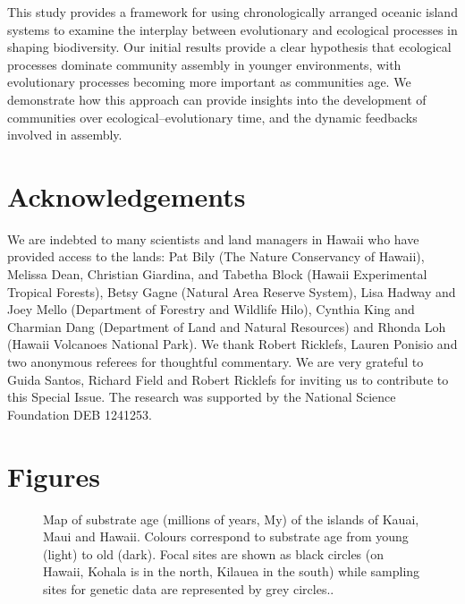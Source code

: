 This study provides a framework for using chronologically arranged
oceanic island systems to examine the interplay between evolutionary
and ecological processes in shaping biodiversity. Our initial results
provide a clear hypothesis that ecological processes dominate
community assembly in younger environments, with evolutionary
processes becoming more important as communities age. We demonstrate
how this approach can provide insights into the development of
communities over ecological–evolutionary time, and the dynamic
feedbacks involved in assembly.


\section*{Acknowledgements}

We are indebted to many scientists and land managers in Hawaii who
have provided access to the lands: Pat Bily (The Nature Conservancy of
Hawaii), Melissa Dean, Christian Giardina, and Tabetha Block (Hawaii
Experimental Tropical Forests), Betsy Gagne (Natural Area Reserve
System), Lisa Hadway and Joey Mello (Department of Forestry and
Wildlife Hilo), Cynthia King and Charmian Dang (Department of Land and
Natural Resources) and Rhonda Loh (Hawaii Volcanoes National Park). We
thank Robert Ricklefs, Lauren Ponisio and two anonymous referees for
thoughtful commentary. We are very grateful to Guida Santos, Richard
Field and Robert Ricklefs for inviting us to contribute to this
Special Issue. The research was supported by the National Science
Foundation DEB 1241253.

% 
% 

\clearpage

\section*{Figures}

\begin{figure}
  \caption[Map of substrate age]{Map of substrate age (millions of
years, My) of the islands of Kauai, Maui and Hawaii. Colours
correspond to substrate age from young (light) to old (dark). Focal
sites are shown as black circles (on Hawaii, Kohala is in the north,
Kilauea in the south) while sampling sites for genetic data are
represented by grey circles..}
  \label{fig:map}
\end{figure}

